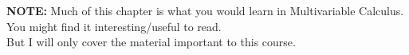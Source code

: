\documentclass[pdf,9pt]{beamer}
\date{Chapter 4. Vector Geometry\\ \S 4-1. Vectors and Lines}
\begin{document}







\begin{frame}[fragile]
   \tableofcontents
\end{frame}
\begin{frame}
 \begin{center}
   {\bf NOTE:} Much of this chapter is what you would learn in Multivariable Calculus. \\ You might find it interesting/useful to read. \\ But I will only cover the material important to this course.
     \end{center}
\end{frame}
\end{document}
